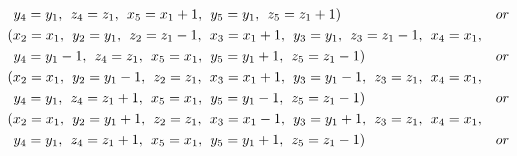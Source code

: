 \begin{align*}
&\hspace{1ex} y_{4}=y_{1},\hspace{1ex} z_{4}=z_{1},\hspace{1ex} x_{5}=x_{1}+1,\hspace{1ex} y_{5}=y_{1},\hspace{1ex} z_{5}=z_{1}+1)&or\\ 
&(x_{2}=x_{1},\hspace{1ex} y_{2}=y_{1},\hspace{1ex} z_{2}=z_{1}-1,\hspace{1ex} x_{3}=x_{1}+1,\hspace{1ex} y_{3}=y_{1},\hspace{1ex} z_{3}=z_{1}-1,\hspace{1ex} x_{4}=x_{1},\\
&\hspace{1ex} y_{4}=y_{1}-1,\hspace{1ex} z_{4}=z_{1},\hspace{1ex} x_{5}=x_{1},\hspace{1ex} y_{5}=y_{1}+1,\hspace{1ex} z_{5}=z_{1}-1)&or\\ 
&(x_{2}=x_{1},\hspace{1ex} y_{2}=y_{1}-1,\hspace{1ex} z_{2}=z_{1},\hspace{1ex} x_{3}=x_{1}+1,\hspace{1ex} y_{3}=y_{1}-1,\hspace{1ex} z_{3}=z_{1},\hspace{1ex} x_{4}=x_{1},\\
&\hspace{1ex} y_{4}=y_{1},\hspace{1ex} z_{4}=z_{1}+1,\hspace{1ex} x_{5}=x_{1},\hspace{1ex} y_{5}=y_{1}-1,\hspace{1ex} z_{5}=z_{1}-1)&or\\ 
&(x_{2}=x_{1},\hspace{1ex} y_{2}=y_{1}+1,\hspace{1ex} z_{2}=z_{1},\hspace{1ex} x_{3}=x_{1}-1,\hspace{1ex} y_{3}=y_{1}+1,\hspace{1ex} z_{3}=z_{1},\hspace{1ex} x_{4}=x_{1},\\
&\hspace{1ex} y_{4}=y_{1},\hspace{1ex} z_{4}=z_{1}+1,\hspace{1ex} x_{5}=x_{1},\hspace{1ex} y_{5}=y_{1}+1,\hspace{1ex} z_{5}=z_{1}-1)&or\\ 

\end{align*}
